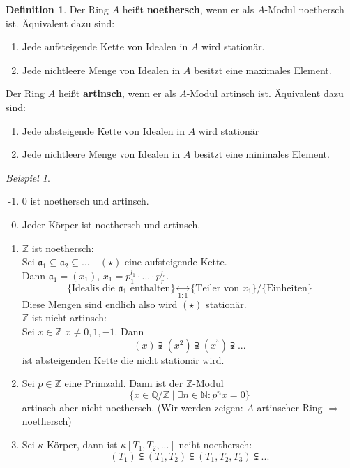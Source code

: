 \documentclass[10pt,a4paper]{article}
\newcommand{\N}{\ensuremath{\mathbb{N}}}
\newcommand{\Z}{\ensuremath{\mathbb{Z}}}
\newcommand{\Q}{\ensuremath{\mathbb{Q}}}
\newcounter{thm}[section]
\theoremstyle{definition}
\newtheorem{definition}[thm]{Definition}
\theoremstyle{plain}
\theoremstyle{remark}
\newtheorem{exm}[thm]{Beispiel}
\begin{document}
\addtocounter{thm}{-1}
\begin{definition}
	Der Ring $A$ heißt \textbf{noethersch}, wenn er als $A$-Modul noethersch ist.
	Äquivalent dazu sind:
	\begin{enumerate}
		\item Jede aufsteigende Kette von Idealen in $A$ wird stationär.
		\item Jede nichtleere Menge von Idealen in $A$ besitzt eine maximales Element.
	\end{enumerate}
	Der Ring $A$ heißt \textbf{artinsch}, wenn er als $A$-Modul artinsch ist.
	Äquivalent dazu sind:
	\begin{enumerate}
		\item Jede absteigende Kette von Idealen in $A$ wird stationär
		\item Jede nichtleere Menge von Idealen in $A$ besitzt eine minimales Element.
	\end{enumerate}
\end{definition}
\begin{exm}
	\begin{enumerate}
		\setcounter{enumi}{-2}
		\item $0$  ist noethersch und artinsch.
		\item Jeder Körper ist noethersch und artinsch.
		\item $\Z$ ist noethersch:\\
		Sei $\mathfrak a_1\subseteq \mathfrak a_2\subseteq...\quad (\star)$ eine aufsteigende Kette. \\
		Dann $\mathfrak a_1=(x_1)$, $x_1=p_1^{l_1}\cdot...\cdot p_r^{l_r}$.
		\[\{\text{Idealis die $\mathfrak a_1$ enthalten}\}\underset{1:1}{\leftrightarrow}\{\text{Teiler von $x_1$}\}/\{\text{Einheiten}\}\]
		Diese Mengen sind endlich also wird $(\star)$ stationär.\\
		$\Z$ ist nicht artinsch:\\
		Sei $x\in\Z$ $x\neq 0,1,-1$. Dann\\
		\[(x)\supsetneqq(x^2)\supsetneqq(x^^3)\supsetneqq...\]
		ist absteigenden Kette die nicht stationär wird.
		\item Sei $p\in\Z$ eine Primzahl. Dann ist der $\Z$-Modul
		\[\{x\in\Q/\Z\mid \exists n\in\N:p^nx=0\}\]
		artinsch aber nicht noethersch.
		(Wir werden zeigen: $A$ artinscher Ring $\Rightarrow$ noethersch)
		\item Sei $\kappa$ Körper, dann ist $\kappa[T_1,T_2,...]$ nciht noethersch:
		\[(T_1)\subsetneqq(T_1,T_2)\subsetneqq(T_1,T_2,T_3)\subsetneqq...\]
	\end{enumerate}
\end{exm}
\end{document}
